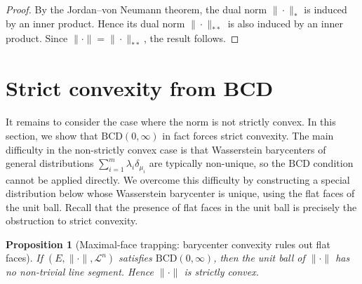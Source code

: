 \documentclass[10pt,a4paper]{amsart}
\numberwithin{equation}{section}
\newtheorem{proposition}[theorem]{Proposition}
\newcommand{\cL}{\mathcal L}
\begin{document}
	\begin{proof}
		By the Jordan--von Neumann theorem, the dual norm $\|\cdot\|_*$ is induced by an inner product. Hence its dual norm $\|\cdot\|_{**}$ is also induced by an inner product. Since $\|\cdot\|=\|\cdot\|_{**}$, the result follows.
	\end{proof}
	
	
	\section{Strict convexity from BCD}\label{sec:strict-convexity}
	
		It remains to consider the case where the norm is not strictly convex. In this section, we show that $\mathrm{BCD}(0,\infty)$ in fact forces strict convexity. The main difficulty in the non-strictly convex case is that Wasserstein barycenters of general distributions $\sum_{i=1}^{m}\lambda_i\delta_{\mu_i}$ are typically non-unique, so the $\mathrm{BCD}$ condition cannot be applied directly. We overcome this difficulty by constructing a special distribution below whose Wasserstein barycenter is unique, using the flat faces of the unit ball. Recall that the presence of flat faces in the unit ball is precisely the obstruction to strict convexity.
	
	\begin{proposition}[Maximal-face trapping: barycenter convexity rules out flat faces]
		\label{prop:strict-convexity}
		If $(E,\|\cdot\|,\cL^n)$ satisfies $\mathrm{BCD}(0,\infty)$, then the unit ball of $\|\cdot\|$ has no non-trivial line segment. Hence $\|\cdot\|$ is strictly convex.
	\end{proposition}
	
\end{document}
